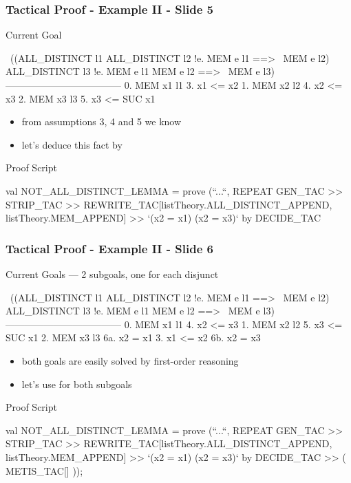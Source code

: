 \begin{frame}[fragile]
\frametitle{Tactical Proof - Example II - Slide 5}

\begin{block}{Current Goal}
\begin{semiverbatim}\scriptsize
~((ALL_DISTINCT l1 \holAnd{} ALL_DISTINCT l2 \holAnd{} !e. MEM e l1 ==> ~MEM e l2) \holAnd{}
  ALL_DISTINCT l3 \holAnd{} !e. MEM e l1 \holOr{} MEM e l2 ==> ~MEM e l3)
------------------------------------
  0.  MEM x1 l1       3.  x1 <= x2    
  1.  MEM x2 l2       4.  x2 <= x3    
  2.  MEM x3 l3       5.  x3 <= SUC x1
\end{semiverbatim}
\end{block}

\begin{itemize}
\item from assumptions 3, 4 and 5 we know 
\item let's deduce this fact by 
\end{itemize}
\begin{block}{Proof Script}
\begin{semiverbatim}\scriptsize
val NOT_ALL_DISTINCT_LEMMA = prove (``...``,
REPEAT GEN\_TAC >> STRIP\_TAC >>
REWRITE\_TAC[listTheory.ALL_DISTINCT\_APPEND, listTheory.MEM\_APPEND] >>
`(x2 = x1) \holOr{} (x2 = x3)` by DECIDE_TAC
\end{semiverbatim}
\end{block}
\end{frame}


\begin{frame}[fragile]
\frametitle{Tactical Proof - Example II - Slide 6}

\begin{block}{Current Goals --- 2 subgoals, one for each disjunct}
\begin{semiverbatim}\scriptsize
~((ALL_DISTINCT l1 \holAnd{} ALL_DISTINCT l2 \holAnd{} !e. MEM e l1 ==> ~MEM e l2) \holAnd{}
  ALL_DISTINCT l3 \holAnd{} !e. MEM e l1 \holOr{} MEM e l2 ==> ~MEM e l3)
------------------------------------
  0.  MEM x1 l1       4.  x2 <= x3    
  1.  MEM x2 l2       5.  x3 <= SUC x1
  2.  MEM x3 l3       6a. x2 = x1
  3.  x1 <= x2        6b. x2 = x3
\end{semiverbatim}
\end{block}

\begin{itemize}
\item both goals are easily solved by first-order reasoning
\item let's use  for both subgoals
\end{itemize}
\begin{block}{Proof Script}
\begin{semiverbatim}\scriptsize
val NOT_ALL_DISTINCT_LEMMA = prove (``...``,
REPEAT GEN\_TAC >> STRIP\_TAC >>
REWRITE\_TAC[listTheory.ALL_DISTINCT\_APPEND, listTheory.MEM\_APPEND] >>
`(x2 = x1) \holOr{} (x2 = x3)` by DECIDE_TAC >> (
  METIS\_TAC[]
));
\end{semiverbatim}
\end{block}
\end{frame}


